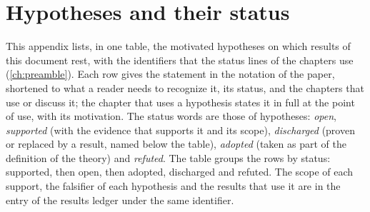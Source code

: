 \section{Hypotheses and their status}
\label{ch:hypotheses}

This appendix lists, in one table, the motivated hypotheses on which results of this document rest, with the identifiers that the status lines of the chapters use (\cref{ch:preamble}).
Each row gives the statement in the notation of the paper, shortened to what a reader needs to recognize it, its status, and the chapters that use or discuss it; the chapter that uses a hypothesis states it in full at the point of use, with its motivation.
The status words are those of hypotheses: \emph{open}, \emph{supported} (with the evidence that supports it and its scope), \emph{discharged} (proven or replaced by a result, named below the table), \emph{adopted} (taken as part of the definition of the theory) and \emph{refuted}.
The table groups the rows by status: supported, then open, then adopted, discharged and refuted.
The scope of each support, the falsifier of each hypothesis and the results that use it are in the entry of the results ledger under the same identifier.

